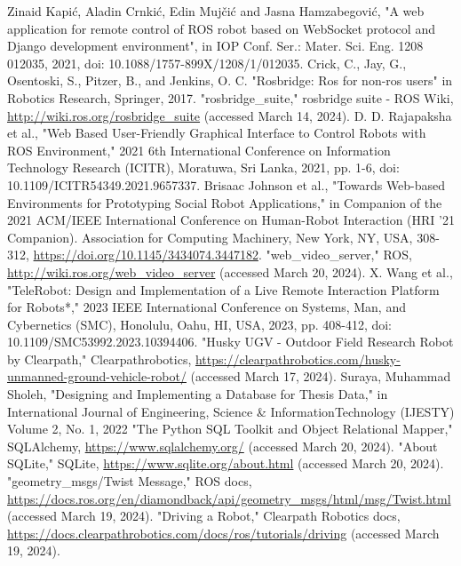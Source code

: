 \documentclass[conference]{IEEEtran}
\begin{document}
\begin{thebibliography}{00}
 Zinaid Kapić, Aladin Crnkić, Edin Mujčić and Jasna Hamzabegović, "A web application for remote control of ROS robot based on WebSocket protocol and Django development environment", in IOP Conf. Ser.: Mater. Sci. Eng. 1208 012035, 2021, doi: 10.1088/1757-899X/1208/1/012035.
 Crick, C., Jay, G., Osentoski, S., Pitzer, B., and Jenkins, O. C. "Rosbridge: Ros for non-ros users" in Robotics Research, Springer, 2017.
"rosbridge\_suite," rosbridge suite - ROS Wiki, \url{http://wiki.ros.org/rosbridge_suite} (accessed March 14, 2024).
 D. D. Rajapaksha et al., "Web Based User-Friendly Graphical Interface to Control Robots with ROS Environment," 2021 6th International Conference on Information Technology Research (ICITR), Moratuwa, Sri Lanka, 2021, pp. 1-6, doi: 10.1109/ICITR54349.2021.9657337.
Brisaac Johnson et al., "Towards Web-based Environments for Prototyping Social Robot Applications," in Companion of the 2021 ACM/IEEE International Conference on Human-Robot Interaction (HRI '21 Companion). Association for Computing Machinery, New York, NY, USA, 308-312, \url{https://doi.org/10.1145/3434074.3447182}.
"web\_video\_server," ROS, \url{http://wiki.ros.org/web_video_server} (accessed March 20, 2024).
X. Wang et al., "TeleRobot: Design and Implementation of a Live Remote Interaction Platform for Robots*," 2023 IEEE International Conference on Systems, Man, and Cybernetics (SMC), Honolulu, Oahu, HI, USA, 2023, pp. 408-412, doi: 10.1109/SMC53992.2023.10394406.
"Husky UGV - Outdoor Field Research Robot by Clearpath," Clearpathrobotics, \url{https://clearpathrobotics.com/husky-unmanned-ground-vehicle-robot/} (accessed March 17, 2024).
 Suraya, Muhammad Sholeh, "Designing and Implementing a Database for Thesis Data," in International Journal of Engineering, Science \& InformationTechnology (IJESTY) Volume 2, No. 1, 2022
"The Python SQL Toolkit and Object Relational Mapper," SQLAlchemy, \url{https://www.sqlalchemy.org/} (accessed March 20, 2024).
"About SQLite," SQLite, \url{https://www.sqlite.org/about.html} (accessed March 20, 2024).
"geometry\_msgs/Twist Message," ROS docs, \url{https://docs.ros.org/en/diamondback/api/geometry_msgs/html/msg/Twist.html} (accessed March 19, 2024).
"Driving a Robot," Clearpath Robotics docs, \url{https://docs.clearpathrobotics.com/docs/ros/tutorials/driving} (accessed March 19, 2024).

\end{thebibliography}
\end{document}
